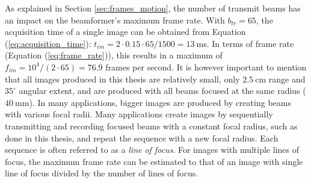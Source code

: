 As explained in Section \ref{sec:frames_motion}, the number of transmit beams has an impact on the beamformer's maximum frame rate. With $b_{tr} = 65$, the acquisition time of a single image can be obtained from Equation (\ref{eq:acquisition_time}): $t_{im} = 2 \cdot 0.15 \cdot 65 / 1500 = 13~$ms. In terms of frame rate (Equation (\ref{eq:frame_rate})), this results in a maximum of $f_{im} = 10^4 / (2 \cdot 65) = 76.9$ frames per second.
It is however important to mention that all images produced in this thesis are relatively small, only $2.5~$cm range and $35^\circ$ angular extent, and are produced with all beams focused at the same radius ($40~$mm). In many applications, bigger images are produced by creating beams with various focal radii. Many applications create images by sequentially transmitting and recording focused beams with a constant focal radius, such as done in this thesis, and repeat the sequence with a new focal radius. Each sequence is often referred to as a \textit{line of focus}. For images with multiple lines of focus, the maximum frame rate can be estimated to that of an image with single line of focus divided by the number of lines of focus.
